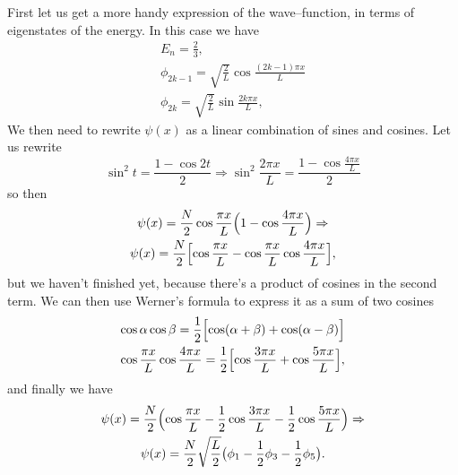 First let us get a more handy expression of the wave--function, in terms of eigenstates of the energy. In this case we have
\begin{gather}
    E_n = \frac{2}{3}, \\
    \phi_{2k-1} = \sqrt{\frac{2}{L}} \cos \frac{(2k - 1) \pi x}{L} \\
    \phi_{2k} = \sqrt{\frac{2}{L}} \sin \frac{2k \pi x}{L},
\end{gather}
We then need to rewrite $\psi(x)$ as a linear combination of sines and cosines. Let us rewrite 
\begin{equation}
    \sin^2 t = \frac{1 - \cos 2t}{2} \Rightarrow
    \sin^2 \frac{2 \pi x}{L} = \frac{1 - \cos \frac{4 \pi x}{L}}{2}
\end{equation}
so then
\begin{gather}
    \psi (x) = \frac{N}{2} \cos \frac{\pi x}{L}\Bigl( 1 - \cos \frac{4 \pi x}{L} \Bigr) \Rightarrow \notag \\
    \psi (x) = \frac{N}{2} \Bigl[ \cos \frac{\pi x}{L} - \cos \frac{\pi x}{L} \cos \frac{4 \pi x}{L} \Bigr],
\end{gather}
but we haven't finished yet, because there's a product of cosines in the second term. We can then use Werner's formula to express it as a sum of two cosines
\begin{gather}
    \cos \alpha \cos \beta = \frac{1}{2} \Bigl[ \cos (\alpha + \beta) + \cos (\alpha - \beta) \Bigr] \notag \\
    \cos \frac{\pi x}{L} \cos \frac{4 \pi x}{L} = \frac{1}{2} \Bigl[ \cos \frac{3 \pi x}{L} + \cos \frac{5 \pi x}{L} \Bigr],
\end{gather}
and finally we have 
\begin{gather}
    \psi(x) = \frac{N}{2} \Bigl( \cos \frac{\pi x}{L} - \frac{1}{2} \cos \frac{3 \pi x}{L} - \frac{1}{2} \cos \frac{5 \pi x}{L} \Bigr) \Rightarrow \notag \\
    \psi(x) = \frac{N}{2} \sqrt{\frac{L}{2}} \bigl( \phi_1 - \frac{1}{2} \phi_3 - \frac{1}{2} \phi_5 \bigr).
\end{gather}
